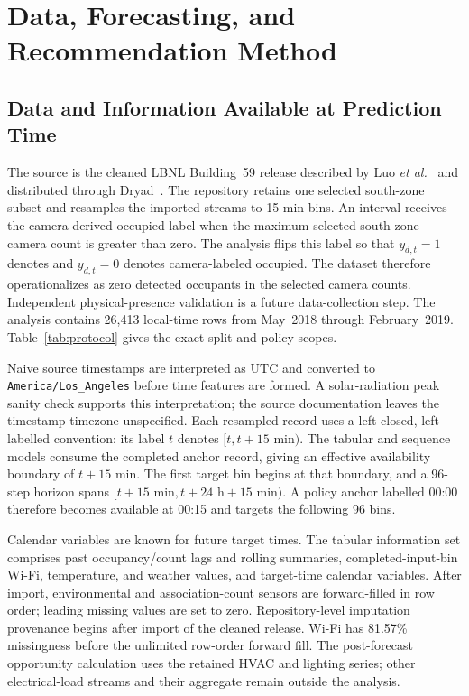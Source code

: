 \section{Data, Forecasting, and Recommendation Method}

\subsection{Data and Information Available at Prediction Time}

The source is the cleaned LBNL Building~59 release described by Luo \emph{et al.}~\cite{Luo2022} and distributed through Dryad~\cite{Hong2022}. The repository retains one selected south-zone subset and resamples the imported streams to 15-min bins. An interval receives the camera-derived occupied label when the maximum selected south-zone camera count is greater than zero. The analysis flips this label so that $y_{d,t}=1$ denotes \emptyclass{} and $y_{d,t}=0$ denotes camera-labeled occupied. The dataset therefore operationalizes \emptyclass{} as zero detected occupants in the selected camera counts. Independent physical-presence validation is a future data-collection step. The analysis contains 26,413 local-time rows from May~2018 through February~2019. Table~\ref{tab:protocol} gives the exact split and policy scopes.

Naive source timestamps are interpreted as UTC and converted to \texttt{America/Los\_Angeles} before time features are formed. A solar-radiation peak sanity check supports this interpretation; the source documentation leaves the timestamp timezone unspecified. Each resampled record uses a left-closed, left-labelled convention: its label $t$ denotes $[t,t+15\text{ min})$. The tabular and sequence models consume the completed anchor record, giving an effective availability boundary of $t+15$ min. The first target bin begins at that boundary, and a 96-step horizon spans $[t+15\text{ min},t+24\text{ h}+15\text{ min})$. A policy anchor labelled 00:00 therefore becomes available at 00:15 and targets the following 96 bins.

Calendar variables are known for future target times. The tabular information set comprises past occupancy/count lags and rolling summaries, completed-input-bin Wi-Fi, temperature, and weather values, and target-time calendar variables. After import, environmental and association-count sensors are forward-filled in row order; leading missing values are set to zero. Repository-level imputation provenance begins after import of the cleaned release. Wi-Fi has 81.57\% missingness before the unlimited row-order forward fill. The post-forecast opportunity calculation uses the retained HVAC and lighting series; other electrical-load streams and their aggregate remain outside the analysis.

